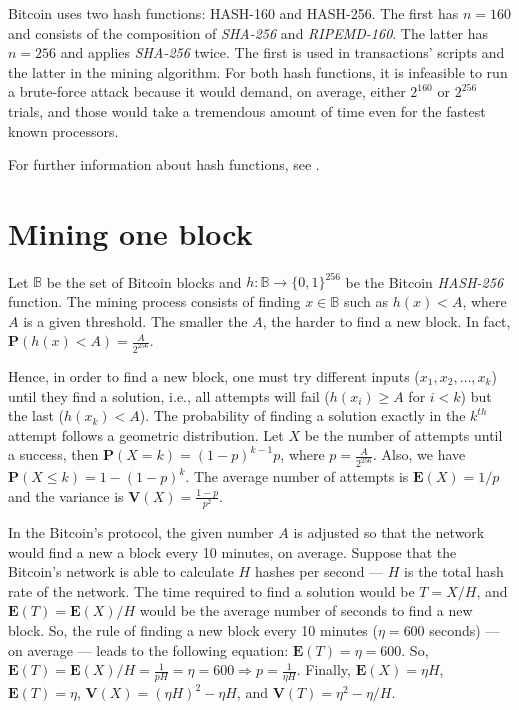 Bitcoin uses two hash functions: HASH-160 and HASH-256. The first has $n=160$ and consists of the composition of \textit{SHA-256} and \textit{RIPEMD-160}. The latter has $n=256$ and applies \textit{SHA-256} twice. The first is used in transactions' scripts and the latter in the mining algorithm. For both hash functions, it is infeasible to run a brute-force attack because it would demand, on average, either $2^{160}$ or $2^{256}$ trials, and those would take a tremendous amount of time even for the fastest known processors.

For further information about hash functions, see \citet{gilbert2003security, dobbertin1996ripemd}.


\section{Mining one block}

Let $\mathbb{B}$ be the set of Bitcoin blocks and $h: \mathbb{B} \rightarrow \{0, 1\}^{256}$ be the Bitcoin \textit{HASH-256} function. The mining process consists of finding $x \in \mathbb{B}$ such as $h(x) < A$, where $A$ is a given threshold. The smaller the $A$, the harder to find a new block. In fact, $\mathbf{P}(h(x) < A) = \frac{A}{2^{256}}$.

Hence, in order to find a new block, one must try different inputs ($x_1, x_2, \dots, x_k$) until they find a solution, i.e., all attempts will fail ($h(x_i) \geq A$ for $i < k$) but the last ($h(x_k) < A$). The probability of finding a solution exactly in the $k^{th}$ attempt follows a geometric distribution. Let $X$ be the number of attempts until a success, then $\mathbf{P}(X = k) = (1-p)^{k-1} p$, where $p = \frac{A}{2^{256}}$. Also, we have $\mathbf{P}(X \leq k) = 1 - (1-p)^k$. The average number of attempts is $\mathbf{E}(X) = 1/p$ and the variance is $\mathbf{V}(X) = \frac{1-p}{p^2}$.

In the Bitcoin's protocol, the given number $A$ is adjusted so that the network would find a new a block every 10 minutes, on average. Suppose that the Bitcoin's network is able to calculate $H$ hashes per second --- $H$ is the total hash rate of the network. The time required to find a solution would be $T=X/H$, and $\mathbf{E}(T) = \mathbf{E}(X)/H$ would be the average number of seconds to find a new block. So, the rule of finding a new block every 10 minutes ($\eta = 600$ seconds) --- on average --- leads to the following equation: $\mathbf{E}(T) = \eta = 600$. So, $\mathbf{E}(T) = \mathbf{E}(X)/H = \frac{1}{pH} = \eta = 600 \Rightarrow p = \frac{1}{\eta H}$. Finally, $\mathbf{E}(X) = \eta H$, $\mathbf{E}(T) = \eta$, $\mathbf{V}(X) = (\eta H)^2 - \eta H$, and $\mathbf{V}(T) = \eta^2 - \eta/H$.

